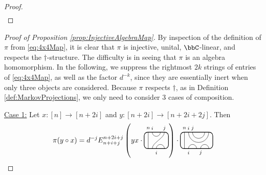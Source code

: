 \documentclass[11pt]{article}
\theoremstyle{plain}
\theoremstyle{definition}
\newcommand{\TLPlusPIso}[3]{
 \TLTStart
 \TLTThrough{#1}
 \TLTSnakeR{#2}{#3}
 \TLTEnd
}
\newcommand{\TLCapJoin}[5]{
 \TLTStart
 \TLTThrough{#1}
 \TLTCapJoin{#2}{#3}{#4}{#5}
 \TLTEnd
}
\newcommand{\TLTCalcLabelOffset}[3][0cm]{
 \settowidth{#2}{\scriptsize{$#3$}}
 \setlength{#2}{.5#2}
 \setlength{#2}{\maxof{#2}{#1}}
}
\newcommand{\TLTEnd}{
 \draw[thick, rounded corners = 5pt] (0,0) rectangle ($ (TLTlead) + (0,.8) $);
 \end{tikzpicture}
}
\newcommand{\TLTStart}{
 \begin{tikzpicture}[baseline=.3cm]
 \coordinate (TLTlead) at (.2,0); %
 \let\TLTlabelwidth\relax
 \newlength{\TLTlabelwidth}
}
\newcommand{\TLTThrough}[1]{
 \TLTCalcLabelOffset[.2cm]{\TLTlabelwidth}{#1}
 \coordinate (TLTlead) at ($ (TLTlead) + ({\TLTlabelwidth},0) $);
 \begin{scope}[shift=(TLTlead)]
  \draw (0,0) -- (0,.8);
  \node at (0,1) {\scriptsize{$#1$}};
 \end{scope}
  \coordinate (TLTlead) at ($ (TLTlead) + ({\TLTlabelwidth},0) $);
}
\newcommand{\TLTSnakeR}[2]{
 \let\TLTscwidth\relax
 \newlength{\TLTscwidth}
 \let\TLTsswidth\relax
 \newlength{\TLTsswidth}
 \TLTCalcLabelOffset[.2cm]{\TLTscwidth}{#1}
 \TLTCalcLabelOffset[.5cm]{\TLTsswidth}{#2}
 \setlength{\TLTlabelwidth}{\TLTscwidth+\TLTsswidth}
 \setlength{\TLTlabelwidth}{\maxof{\TLTlabelwidth}{.7cm}} %
 \coordinate (TLTlead) at ($ (TLTlead) + ({\TLTscwidth},0) $);
 \begin{scope}[shift=(TLTlead)]
  \draw (.1,.8) arc (-180:0:.2cm);
  \draw (.1,0) .. controls ++(90:.3cm) and ++(270:.3cm) .. ($ (.1,.8) + ({\TLTlabelwidth},0) $);
  \draw ($ (.1,0) + ({\TLTsswidth},0) $) arc (180:0:.2cm);
  \node at (.1,1) {\scriptsize{$#1$}};
  \node at ($ (.1,1) + ({\TLTlabelwidth},0) $) {\scriptsize{$#2$}};
  \node at ($ (.1,-.2) + ({\TLTsswidth},0) $) {\scriptsize{$#1$}};
 \end{scope}
 \coordinate (TLTlead) at ($ (TLTlead) + ({\TLTlabelwidth+\TLTsswidth},0) $);
}
\newcommand{\TLTCapJoin}[4]{
 \let\TLTjoinlwidth\relax
 \newlength{\TLTjoinlwidth}
 \let\TLTjoinrwidth\relax
 \newlength{\TLTjoinrwidth}
 \let\TLTsplitlwidth\relax
 \newlength{\TLTsplitlwidth}
 \let\TLTsplitrwidth\relax
 \newlength{\TLTsplitrwidth}
 \TLTCalcLabelOffset[.8cm]{\TLTjoinrwidth}{#4} %
 \TLTCalcLabelOffset[.15cm]{\TLTjoinlwidth}{#3} %
 \TLTCalcLabelOffset[.6cm]{\TLTsplitlwidth}{#1}
 \TLTCalcLabelOffset[.6cm]{\TLTsplitrwidth}{#2}
 \setlength{\TLTlabelwidth}{\maxof{\TLTjoinlwidth}{\TLTsplitlwidth}}
 \coordinate (TLTlead) at ($ (TLTlead) + ({\TLTlabelwidth},0) $);
 \setlength{\TLTlabelwidth}{\maxof{\TLTjoinrwidth}{\TLTsplitrwidth}} %
 \begin{scope}[shift=(TLTlead)]
  \draw (0,.8) arc (-180:0:.5);
  \draw (0.2,.8) arc (-180:0:.3);
  \draw (0,0) arc (180:0:.2);
  \draw ({\TLTsplitlwidth},0) arc (180:0:.2);
  \node at (0,1) {\scriptsize{$#4$}};
  \node at ({\TLTjoinlwidth},1) {\scriptsize{$#3$}};
  \node at (0,-.2) {\scriptsize{$#1$}};
  \node at ({\TLTsplitlwidth},-.2) {\scriptsize{$#2$}};
 \end{scope}
 \coordinate (TLTlead) at ($ (TLTlead) + ({\TLTlabelwidth},0) $);
}
\begin{document}
\begin{proof}
\begin{align*}
\end{align*}
\end{proof}

\begin{proof}[Proof of Proposition \ref{prop:InjectiveAlgebraMap}]
By inspection of the definition of $\pi$ from \eqref{eq:4x4Map}, it is clear that $\pi$ is injective, unital, $\bbC$-linear, and respects the $\dag$-structure. 
The difficulty is in seeing that $\pi$ is an algebra homomorphism. 
In the following, we suppress the rightmost $2k$ strings of entries of \eqref{eq:4x4Map}, as well as the factor $d^{-k}$, since they are essentially inert when only three objects are considered. 
Because $\pi$ respects $\dag$, as in Definition \ref{def:MarkovProjections}, we only need to consider 3 cases of composition.
\item[\underline{Case 1:}]
Let $x:[n]\rightarrow [n+2i]$ and $y:[n+2i]\rightarrow [n+2i+2j]$. 
Then 
$$
\pi(y\circ x)
=
d^{-j}E_{n+i+j}^{n+2i+j}
\left(yx \cdot 
 \begin{tikzpicture}[baseline=.3cm]
  \draw (.2,0) -- (.2,.8);
  \node at (.2,1) {\scriptsize{$n$}};
  \draw (.4,.8) arc (-180:0:.2cm);
  \node at (.4,1) {\scriptsize{$i$}};
  \draw (.4,0) .. controls ++(90:.3cm) and ++(270:.3cm) .. (1,.8);
  \node at (1,1) {\scriptsize{$j$}};
  \draw (.6,0) arc (180:0:.2cm);
  \node at (.6,-.2) {\scriptsize{$i$}};
  \draw[thick, rounded corners = 5pt] (0,0) rectangle (1.2,.8);
 \end{tikzpicture}
 \right) 
\cdot 
 \begin{tikzpicture}[baseline=.3cm]
  \draw (.2,0) -- (.2,.8);
  \node at (.2,1) {\scriptsize{$n$}};
  \draw (.4,0) arc (180:0:.2cm);
  \node at (.4,-.2) {\scriptsize{$i$}};
  \draw (1,0) arc (180:0:.2cm);
  \node at (1,-.2) {\scriptsize{$j$}};
  \draw (.4,.8) arc (-180:0:.5cm);
  \node at (.4,1) {\scriptsize{$i$}};
  \draw (.6,.8) arc (-180:0:.3cm);
  \node at (.6,1) {\scriptsize{$j$}};
  \draw[thick, rounded corners = 5pt] (0,0) rectangle (1.6,.8);

\end{tikzpicture}$$
\end{proof}
\end{document}
